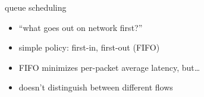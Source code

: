\begin{frame}{queue scheduling}
    \begin{itemize}
    \item ``what goes out on network first?''
    \item simple policy: first-in, first-out (FIFO)
    \vspace{.5cm}
    \item FIFO minimizes per-packet average latency, but\ldots
    \item doesn't distinguish between different flows
    \end{itemize}
\end{frame}
